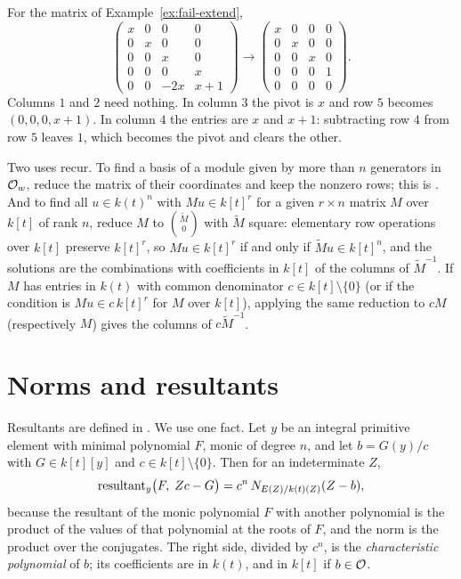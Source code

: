 \begin{example}
For the matrix of Example~\ref{ex:fail-extend},
\[
  \begin{pmatrix}
    x & 0 & 0 & 0 \\ 0 & x & 0 & 0 \\ 0 & 0 & x & 0 \\ 0 & 0 & 0 & x \\
    0 & 0 & -2x & x + 1
  \end{pmatrix}
  \longrightarrow
  \begin{pmatrix}
    x & 0 & 0 & 0 \\ 0 & x & 0 & 0 \\ 0 & 0 & x & 0 \\ 0 & 0 & 0 & 1 \\
    0 & 0 & 0 & 0
  \end{pmatrix} .
\]
Columns $1$ and $2$ need nothing. In column $3$ the pivot is $x$ and row $5$
becomes $(0, 0, 0, x + 1)$. In column $4$ the entries are $x$ and $x + 1$:
subtracting row $4$ from row $5$ leaves $1$, which becomes the pivot and
clears the other.
\end{example}

Two uses recur. To find a basis of a module given by more than $n$
generators in $\mathcal{O}_w$, reduce the matrix of their coordinates and keep the
nonzero rows; this is . And to find all $u \in k(t)^n$
with $M u \in k[t]^r$ for a given $r \times n$ matrix $M$ over $k[t]$ of rank
$n$, reduce $M$ to $\binom{\tilde M}{0}$ with $\tilde M$ square: elementary
row operations over $k[t]$ preserve $k[t]^r$, so $M u \in k[t]^r$ if and only
if $\tilde M u \in k[t]^n$, and the solutions are the combinations with
coefficients in $k[t]$ of the columns of $\tilde M^{-1}$. If $M$ has entries
in $k(t)$ with common denominator $c \in k[t] \setminus \{0\}$ (or if the
condition is $M u \in c\, k[t]^r$ for $M$ over $k[t]$), applying the same
reduction to $c M$ (respectively $M$) gives the columns of $c \tilde M^{-1}$.

\section{Norms and resultants}\label{sec:prelim-resultants}

Resultants are defined in . We use one fact. Let $y$ be an
integral primitive element with minimal polynomial $F$, monic of degree $n$,
and let $b = G(y)/c$ with $G \in k[t][y]$ and $c \in k[t] \setminus \{0\}$.
Then for an indeterminate $Z$,
\begin{equation}\label{eq:norm-resultant}
  \operatorname{resultant}_y\bigl( F,\; Z c - G \bigr) = c^n\, N_{E(Z)/k(t)(Z)}(Z - b) ,
\end{equation}
because the resultant of the monic polynomial $F$ with another polynomial is
the product of the values of that polynomial at the roots of $F$, and the
norm is the product over the conjugates. The right side, divided by $c^n$, is
the \emph{characteristic polynomial} of $b$; its coefficients are in $k(t)$,
and in $k[t]$ if $b \in \mathcal{O}$.

